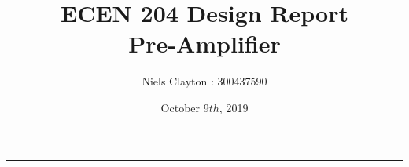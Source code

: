 \documentclass[a4paper,11pt]{article}
\begin{document}
\title{\LARGE{\textbf{ECEN 204 Design Report}\\Pre-Amplifier}}
\author{Niels Clayton : 300437590}
\date{October 9$th$, 2019}
\maketitle
\hrule
\end{document}

